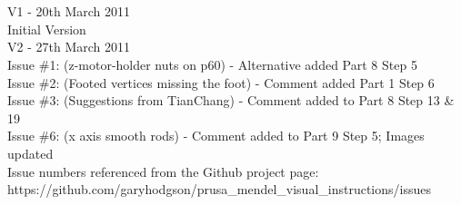 \newpage
{}
{}
\chapter*{}

V1 - 20th March 2011\\
Initial Version\\
V2 - 27th March 2011\\
Issue \#1: (z-motor-holder nuts on p60) - Alternative added Part 8 Step 5\\
Issue \#2: (Footed vertices missing the foot) - Comment added Part 1 Step 6\\
Issue \#3: (Suggestions from TianChang) - Comment added to Part 8 Step 13 \& 19\\
Issue \#6: (x axis smooth rods) - Comment added to Part 9 Step 5; Images
updated\\
Issue numbers referenced from the Github project page:\\
https://github.com/garyhodgson/prusa\_mendel\_visual\_instructions/issues\\
